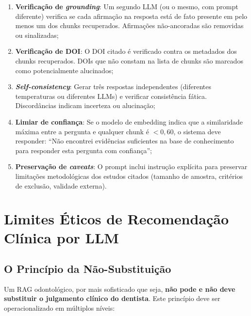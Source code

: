 \begin{enumerate}
    \item \textbf{Verificação de \textit{grounding}}: Um segundo LLM (ou o mesmo, com prompt diferente) verifica se cada afirmação na resposta está de fato presente em pelo menos um dos chunks recuperados. Afirmações não-ancoradas são removidas ou sinalizadas;

    \item \textbf{Verificação de DOI}: O DOI citado é verificado contra os metadados dos chunks recuperados. DOIs que não constam na lista de chunks são marcados como potencialmente alucinados;

    \item \textbf{\textit{Self-consistency}}: Gerar três respostas independentes (diferentes temperaturas ou diferentes LLMs) e verificar consistência fática. Discordâncias indicam incerteza ou alucinação;

    \item \textbf{Limiar de confiança}: Se o modelo de embedding indica que a similaridade máxima entre a pergunta e qualquer chunk é $< 0,60$, o sistema deve responder: ``Não encontrei evidências suficientes na base de conhecimento para responder esta pergunta com confiança'';

    \item \textbf{Preservação de \textit{caveats}}: O prompt inclui instrução explícita para preservar limitações metodológicas dos estudos citados (tamanho de amostra, critérios de exclusão, validade externa).
\end{enumerate}

\section{Limites Éticos de Recomendação Clínica por LLM}

\subsection{O Princípio da Não-Substituição}

Um RAG odontológico, por mais sofisticado que seja, \textbf{não pode e não deve substituir o julgamento clínico do dentista}. Este princípio deve ser operacionalizado em múltiplos níveis:

